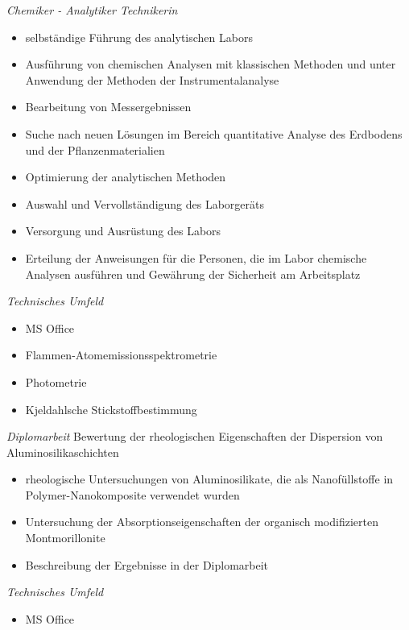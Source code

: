 \documentclass[11pt,a4paper,sans]{moderncv} %
\begin{document}
{
\emph{Chemiker - Analytiker  \newline Technikerin } 
\newline 
\begin{itemize}
	\item selbständige  Führung des analytischen  Labors 
	\item Ausführung von chemischen  Analysen  mit klassischen Methoden und unter Anwendung der Methoden  der Instrumentalanalyse 
	\item Bearbeitung  von Messergebnissen  
	\item Suche nach  neuen  Lösungen  im Bereich  quantitative Analyse des Erdbodens und der Pflanzenmaterialien  
	\item Optimierung  der analytischen  Methoden
	\item Auswahl und Vervollständigung  des Laborgeräts 
	\item Versorgung und Ausrüstung des Labors 
	\item  Erteilung der Anweisungen  für die Personen, die im Labor chemische Analysen ausführen und Gewährung der Sicherheit am Arbeitsplatz 
\end{itemize} 
\emph{Technisches Umfeld \newline}
\begin{itemize}
	\item MS Office
	\item Flammen-Atomemissionsspektrometrie
	\item Photometrie 
	\item Kjeldahlsche Stickstoffbestimmung
\end{itemize}
}

{
\emph{Diplomarbeit \newline} 
\newline \newline Bewertung der rheologischen Eigenschaften der Dispersion von Aluminosilikaschichten
\newline
\begin{itemize}
	\item rheologische Untersuchungen von Aluminosilikate, die als Nanofüllstoffe in Polymer-Nanokomposite verwendet wurden 
	\item Untersuchung der Absorptionseigenschaften der organisch modifizierten Montmorillonite 
	\item Beschreibung der Ergebnisse in der Diplomarbeit \newline    
\end{itemize} 
\emph{Technisches Umfeld \newline}
\begin{itemize}
	\item MS Office 
\end{itemize}
}  
\end{document}
